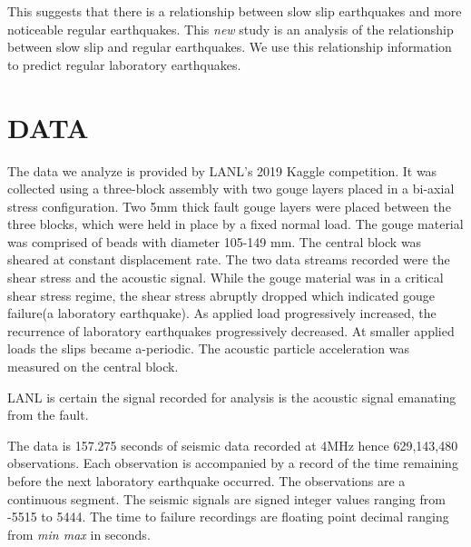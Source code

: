 \documentclass[]{llncs}
\begin{document}
This suggests that there is a relationship between slow slip earthquakes and more noticeable regular earthquakes\cite{SlowSlip}. This {\em new} study is an analysis of the relationship between slow slip and regular earthquakes. We use this relationship information to predict regular laboratory earthquakes. \par


\section{DATA} The data we analyze is provided by LANL's 2019 Kaggle competition\cite{kaggle}. It was collected using a three-block assembly with two gouge layers placed in a bi-axial stress configuration. Two 5mm thick fault gouge layers were placed between the three blocks, which were held in place by a fixed normal load. The gouge material was comprised of beads with diameter 105-149 mm. The central block was sheared at constant displacement rate. The two data streams recorded were the shear stress and the acoustic signal. While the gouge material was in a critical shear stress regime, the shear stress abruptly dropped which indicated gouge failure(a laboratory earthquake). As applied load progressively increased, the recurrence of laboratory earthquakes progressively decreased. At smaller applied loads the slips became a-periodic. The acoustic particle acceleration was measured on the central block.\par

LANL is certain the signal recorded for analysis is the acoustic signal emanating from the fault\cite{Bertrand}.\par

The data is 157.275 seconds of seismic data recorded at 4MHz hence 629,143,480 observations. Each observation is accompanied by a record of the time remaining before the next laboratory earthquake occurred. The observations are a continuous segment. The seismic signals are signed integer values ranging from -5515 to 5444. The time to failure recordings are floating point decimal ranging from {\em min max} in seconds. \par
\end{document}
